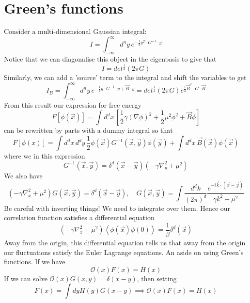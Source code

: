 \documentclass[11pt, oneside]{article}   	%
\begin{document}
\section{Green's functions} 
Consider a multi-dimensional Gaussian integral: 
\[
I = 	\int_{ - \infty } ^ \infty d^ n y \, e^{ - \frac{1}{2 } y^ T  \cdot   G^{ - 1 } \cdot  y  }
\] Notice that we can diagonalise this object 
in the eigenbasis to give that 
\[
	I = det ^{ \frac{1}{ 2}  } ( 2\pi G ) 
\] Similarly, we can add a 'source' term to the integral and shift the variables to get
\[
	I_{ B } = \int_{ - \infty } ^ \infty d^ n y \, e ^{ - \frac{1}{2 } y \cdot  G^{ -1 } \cdot  y + \vec{B} \cdot  y } = det ^{ \frac{1}{2 } } ( 2 \pi G ) e^{ \frac{1}{2 } \vec{B} ^ T \cdot  G \cdot  \vec{B}}
\] From this result our expression for free energy 
\[
	F [ \phi ( \vec{x} ) ] = \int d^ d x\, \left[  \frac{1}{2 } \gamma ( \nabla \phi ) ^  2 + \frac{1}{2 } \mu ^ 2 \phi ^ 2 + \vec{B} \phi  \right]  
\] can be rewritten by parts with a dummy integral so that 
\[
	F [ \phi ( x) ] = \int d^ d x \, d^ d y \, \frac{1}{2 } \phi ( \vec{x} ) G ^{ -1 } ( \vec{x}, \vec{y} ) \phi ( \vec{y} ) + \int d^ d x\, \vec{B} ( \vec{x} ) \phi ( \vec{x} ) 
\] where we in this expression 
\[
	G ^{ -1 } ( \vec{x} , \vec{y} ) = \delta ^ d ( \vec{x} - \vec{y} ) ( - \gamma \nabla ^ 2_y + \mu ^ 2)  
\] We also have 
\[
	( - \gamma \nabla ^ 2 _ x + \mu ^ 2 ) G ( \vec{x}, \vec{y} ) = \delta^ d ( \vec{x} - \vec{y} ) , \quad G ( \vec{x}, \vec{y} ) = \int \frac{ d^ d k }{ ( 2 \pi ) ^ d } \frac{ e^{ - i \vec{k} \cdot ( \vec{x} - \vec{y} ) } }{\gamma k ^ 2 + \mu ^ 2 }
\] Be careful with inverting things! We need to integrate over them. 
Hence our correlation function satisfies a differential equation 
\[
	( - \gamma \nabla ^ 2 _ x + \mu ^ 2 ) \left< \phi ( \vec{x} ) \phi ( 0 )  \right> = \frac{1}{\beta } \delta^ d ( \vec{x} ) 
\] Away from the origin, this differential equation tells us that away from
the origin our fluctuations satisfy the Euler Lagrange equations. 
An aside on using Green's functions. 
If we have 
\[
	\mathcal{ O }( x) F( x) = H ( x) 
\] If we can solve $ \mathcal{ O } ( x) G ( x, y) = \delta ( x - y ) $, then setting
\[
	F ( x) = \int dy H ( y ) G ( x - y ) \implies \mathcal{ O }( x) F( x) = H ( x) 
\]
\end{document}
